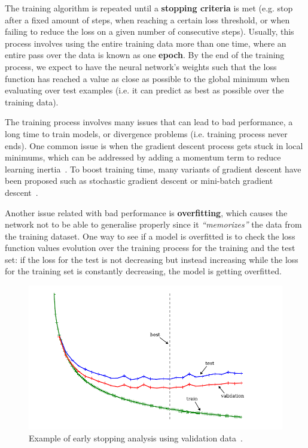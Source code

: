 The training algorithm is repeated until a \textbf{stopping criteria} is met (e.g. stop after 
a fixed amount of steps, when reaching a certain loss threshold, or when failing to reduce the 
loss on a given number of consecutive steps). Usually, this process involves using the entire 
training data more than one time, where an entire pass over the data is known as one \textbf{epoch}. 
By the end of the training process, we expect to have the neural network’s weights such that 
the loss function has reached a value as close as possible to the global minimum when 
evaluating over test examples (i.e. it can predict as best as possible over the training data).

The training process involves many issues that can lead to bad performance, a long time to 
train models, or divergence problems (i.e. training process never ends). One common issue is 
when the gradient descent process gets stuck in local minimums, which can be addressed by 
adding a momentum term to reduce learning inertia~\cite{appendix:plaut1986experiments}. To 
boost training time, many variants of gradient descent have been proposed such as stochastic 
gradient descent or mini-batch gradient descent~\cite{appendix:lecun1998efficient}.

Another issue related with bad performance is \textbf{overfitting}, which causes the network 
not to be able to generalise properly since it \textit{“memorizes”} the data from the training 
dataset. One way to see if a model is overfitted is to check the loss function values 
evolution over the training process for the training and the test set: if the loss for the 
test is not decreasing but instead increasing while the loss for the training set is 
constantly decreasing, the model is getting overfitted.

\begin{figure}[!h]
    \centering
    \includegraphics[scale=.45]{imagenes/appendices/appA_overfitting.PNG}
    \caption{Example of early stopping analysis using validation data~\cite{seqlab:Graves2012-385}.}
    \label{fig:earlyStopppingExample}
\end{figure}

